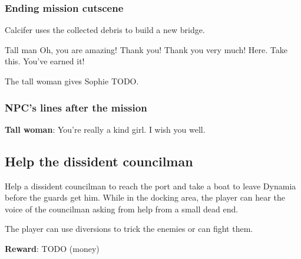 \subsubsection*{Ending mission cutscene}
\begin{screenplay}

Calcifer uses the collected debris to build a new bridge.

\begin{dialogue}[excited]{Tall man}
Oh, you are amazing! Thank you! Thank you very much! Here. Take this. You've earned it!
\end{dialogue}

The tall woman gives Sophie TODO.

\end{screenplay}

\subsubsection*{NPC's lines after the mission}
\textbf{Tall woman}: You're really a kind girl. I wish you well.



\subsection{Help the dissident councilman}
Help a dissident councilman to reach the port and take a boat to leave Dynamia before the guards get him. While in the docking area, the player can hear the voice of the councilman asking from help from a small dead end.

The player can use diversions to trick the enemies or can fight them.

\textbf{Reward}: TODO (money)

